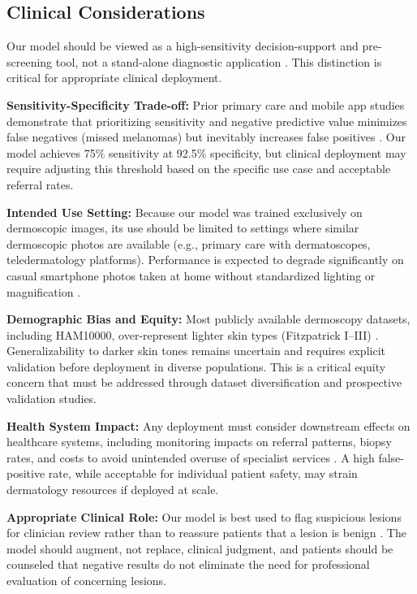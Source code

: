 \documentclass[conference]{IEEEtran}
\begin{document}
\subsection{Clinical Considerations}

Our model should be viewed as a high-sensitivity decision-support and pre-screening tool, not a stand-alone diagnostic application \cite{papachristou2024evaluation,jahn2022overdetection,smakgregoor2023ai}. This distinction is critical for appropriate clinical deployment.

\textbf{Sensitivity-Specificity Trade-off:} Prior primary care and mobile app studies demonstrate that prioritizing sensitivity and negative predictive value minimizes false negatives (missed melanomas) but inevitably increases false positives \cite{papachristou2024evaluation,jahn2022overdetection}. Our model achieves 75\% sensitivity at 92.5\% specificity, but clinical deployment may require adjusting this threshold based on the specific use case and acceptable referral rates.

\textbf{Intended Use Setting:} Because our model was trained exclusively on dermoscopic images, its use should be limited to settings where similar dermoscopic photos are available (e.g., primary care with dermatoscopes, teledermatology platforms). Performance is expected to degrade significantly on casual smartphone photos taken at home without standardized lighting or magnification \cite{papachristou2024evaluation,behara2024ai,smakgregoor2023ai}.

\textbf{Demographic Bias and Equity:} Most publicly available dermoscopy datasets, including HAM10000, over-represent lighter skin types (Fitzpatrick I--III) \cite{behara2024ai,salinas2024systematic}. Generalizability to darker skin tones remains uncertain and requires explicit validation before deployment in diverse populations. This is a critical equity concern that must be addressed through dataset diversification and prospective validation studies.

\textbf{Health System Impact:} Any deployment must consider downstream effects on healthcare systems, including monitoring impacts on referral patterns, biopsy rates, and costs to avoid unintended overuse of specialist services \cite{papachristou2024evaluation,smakgregoor2023ai}. A high false-positive rate, while acceptable for individual patient safety, may strain dermatology resources if deployed at scale.

\textbf{Appropriate Clinical Role:} Our model is best used to flag suspicious lesions for clinician review rather than to reassure patients that a lesion is benign \cite{jahn2022overdetection,smakgregoor2023ai}. The model should augment, not replace, clinical judgment, and patients should be counseled that negative results do not eliminate the need for professional evaluation of concerning lesions.
\end{document}
